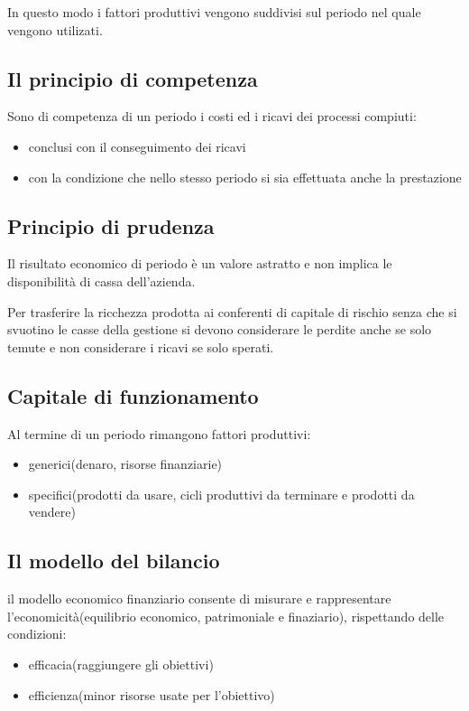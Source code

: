  In questo modo i fattori produttivi vengono suddivisi sul periodo nel quale vengono utilizati.

 \subsection{Il principio di competenza}
 Sono di competenza di un periodo i costi ed i ricavi dei processi compiuti:
 \begin{itemize}
    \item conclusi con il conseguimento dei ricavi
    \item con la condizione che nello stesso periodo si sia effettuata anche la prestazione
 \end{itemize}

 \subsection{Principio di prudenza}
 Il risultato economico di periodo è un valore astratto e non implica le disponibilità
 di cassa dell'azienda.

 Per trasferire la ricchezza prodotta ai conferenti di capitale di rischio senza che si
 svuotino le casse della gestione si devono considerare le perdite anche se solo temute e
 non considerare i ricavi se solo sperati.

 \subsection{Capitale di funzionamento}

 Al termine di un periodo rimangono fattori produttivi:
 \begin{itemize}
    \item generici(denaro, risorse finanziarie)
    \item specifici(prodotti da usare, cicli produttivi da terminare e prodotti da vendere)
 \end{itemize}

 \subsection{Il modello del bilancio}
 il modello economico finanziario consente di misurare e rappresentare l'economicità(equilibrio economico, patrimoniale e finaziario),
 rispettando delle condizioni:
 \begin{itemize}
    \item efficacia(raggiungere gli obiettivi)
    \item efficienza(minor risorse usate per l'obiettivo)
 \end{itemize}

